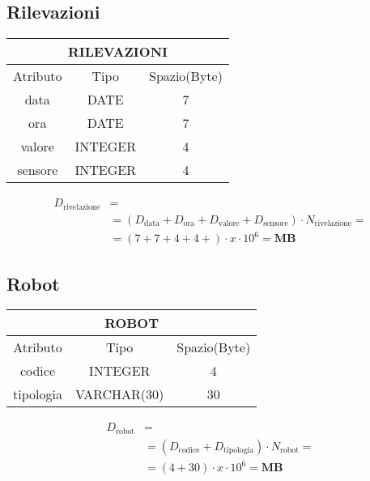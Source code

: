 \subsection{Rilevazioni}
\begin{tabular}{|c|c|c|}
  \hline
  \multicolumn{3}{|c|}{\textbf{RILEVAZIONI}}\\
  \hline
  Atributo & Tipo & Spazio(Byte) \\
  \hline
  data & DATE & 7 \\
  ora & DATE &  7 \\
  valore & INTEGER & 4 \\
  sensore & INTEGER & 4 \\
  \hline
\end{tabular}
\begin{equation}
  \begin{aligned}
    D_{\text{rivelazione}} &=\\
    &=(D_{\text{data}}+D_{\text{ora}}+D_{\text{valore}}+D_{\text{sensore}})\cdot N_{\text{rivelazione}}=\\
    &=(7+7+4+4+)\cdot x\cdot 10^6= \textbf{MB}
  \end{aligned}
\end{equation}
\subsection{Robot}
\begin{tabular}{ |c|c|c|}
  \hline
  \multicolumn{3}{|c|}{\textbf{ROBOT}}\\
  \hline
  Atributo & Tipo & Spazio(Byte) \\
  \hline
  codice & INTEGER & 4\\
  tipologia & VARCHAR(30) & 30\\
  \hline
\end{tabular}
\begin{equation}
  \begin{aligned}
    D_{\text{robot}} &=\\
    &=(D_{\text{codice}}+D_{\text{tipologia}})\cdot N_{\text{robot}}=\\
    &=(4+30)\cdot x\cdot 10^6= \textbf{MB}
  \end{aligned}
\end{equation}
